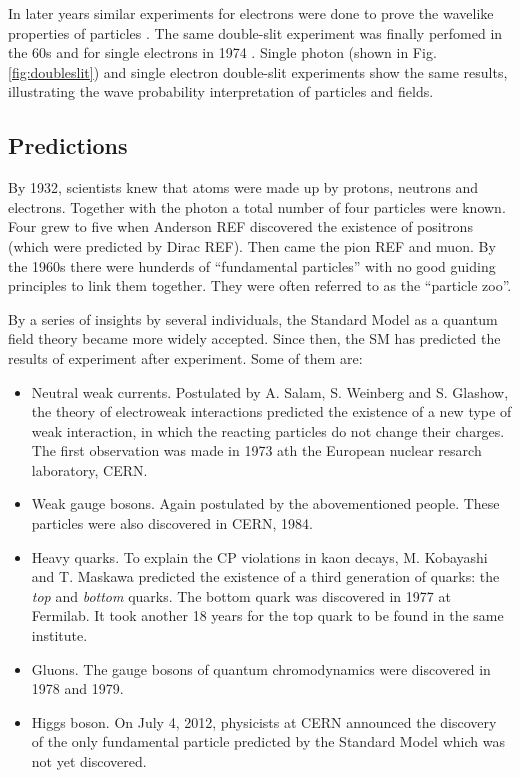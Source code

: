 In later years similar experiments for electrons were done to prove the wavelike properties of particles \cite{Davisson:1927ta,thomson:1927}. The same double-slit experiment was finally perfomed in the 60s \cite{Jonsson1961} and for single electrons in 1974 \cite{merli:1974}. Single photon \cite{weiswynands:2003} (shown in Fig. \ref{fig:doubleslit}) and single electron double-slit experiments show the same results, illustrating the wave probability interpretation of particles and fields.

\subsection{Predictions}
By 1932, scientists knew that atoms were made up by protons, neutrons and electrons. Together with the photon a total number of four particles were known. Four grew to five when Anderson REF discovered the existence of positrons (which were predicted by Dirac REF). Then came the pion REF and muon. By the 1960s there were hunderds of ``fundamental particles'' with no good guiding principles to link them together. They were often referred to as the ``particle zoo''.

By a series of insights by several individuals, the Standard Model as a quantum field theory became more widely accepted. Since then, the SM has predicted the results of experiment after experiment. Some of them are:

\begin{itemize}
\item Neutral weak currents. Postulated by A. Salam, S. Weinberg and S. Glashow, the theory of electroweak interactions predicted the existence of a new type of weak interaction, in which the reacting particles do not change their charges. The first observation was made in 1973 ath the European nuclear resarch laboratory, CERN.
\item Weak gauge bosons. Again postulated by the abovementioned people. These particles were also discovered in CERN, 1984.
\item Heavy quarks. To explain the CP violations in kaon decays, M. Kobayashi and T. Maskawa predicted the existence of a third generation of quarks: the \textit{top} and \textit{bottom} quarks. The bottom quark was discovered in 1977 at Fermilab. It took another 18 years for the top quark to be found in the same institute. 
\item Gluons. The gauge bosons of quantum chromodynamics were discovered in 1978 and 1979.
\item Higgs boson. On July 4, 2012, physicists at CERN announced the discovery of the only fundamental particle predicted by the Standard Model which was not yet discovered. 
\end{itemize}  
